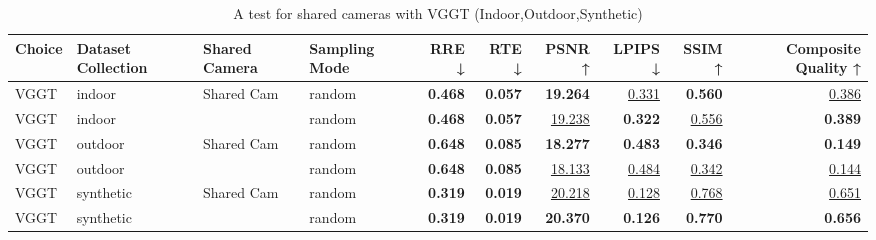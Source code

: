 \begin{table}[H]
\caption{A test for shared cameras with VGGT (Indoor,Outdoor,Synthetic)}
\label{tab:06_shared_camera_vggt_indoor,outdoor,synthetic}
\footnotesize
\begin{tabular}{llllrrrrrr}
\toprule
Choice & Dataset Collection & Shared Camera & Sampling Mode & RRE ↓ & RTE ↓ & PSNR ↑ & LPIPS ↓ & SSIM ↑ & Composite Quality ↑ \\
\midrule
VGGT & indoor & Shared Cam & random & \textbf{0.468} & \textbf{0.057} & \textbf{19.264} & \underline{0.331} & \textbf{0.560} & \underline{0.386} \\
VGGT & indoor &  & random & \textbf{0.468} & \textbf{0.057} & \underline{19.238} & \textbf{0.322} & \underline{0.556} & \textbf{0.389} \\
\midrule
VGGT & outdoor & Shared Cam & random & \textbf{0.648} & \textbf{0.085} & \textbf{18.277} & \textbf{0.483} & \textbf{0.346} & \textbf{0.149} \\
VGGT & outdoor &  & random & \textbf{0.648} & \textbf{0.085} & \underline{18.133} & \underline{0.484} & \underline{0.342} & \underline{0.144} \\
\midrule
VGGT & synthetic & Shared Cam & random & \textbf{0.319} & \textbf{0.019} & \underline{20.218} & \underline{0.128} & \underline{0.768} & \underline{0.651} \\
VGGT & synthetic &  & random & \textbf{0.319} & \textbf{0.019} & \textbf{20.370} & \textbf{0.126} & \textbf{0.770} & \textbf{0.656} \\
\bottomrule
\end{tabular}
\end{table}